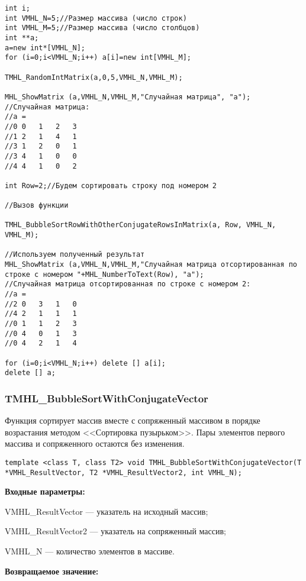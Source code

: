\documentclass[a4paper,12pt]{article}
\begin{document}
\begin{lstlisting}[label=code_use_TMHL_BubbleSortRowWithOtherConjugateRowsInMatrix,caption=Пример использования]
int i;
int VMHL_N=5;//Размер массива (число строк)
int VMHL_M=5;//Размер массива (число столбцов)
int **a;
a=new int*[VMHL_N];
for (i=0;i<VMHL_N;i++) a[i]=new int[VMHL_M];

TMHL_RandomIntMatrix(a,0,5,VMHL_N,VMHL_M);

MHL_ShowMatrix (a,VMHL_N,VMHL_M,"Случайная матрица", "a");
//Случайная матрица:
//a =
//0	0	1	2	3
//1	2	1	4	1
//3	1	2	0	1
//3	4	1	0	0
//4	4	1	0	2

int Row=2;//Будем сортировать строку под номером 2

//Вызов функции

TMHL_BubbleSortRowWithOtherConjugateRowsInMatrix(a, Row, VMHL_N, VMHL_M);

//Используем полученный результат
MHL_ShowMatrix (a,VMHL_N,VMHL_M,"Случайная матрица отсортированная по строке с номером "+MHL_NumberToText(Row), "a");
//Случайная матрица отсортированная по строке с номером 2:
//a =
//2	0	3	1	0
//4	2	1	1	1
//0	1	1	2	3
//0	4	0	1	3
//0	4	2	1	4

for (i=0;i<VMHL_N;i++) delete [] a[i];
delete [] a;
\end{lstlisting}

\subsubsection{TMHL\_BubbleSortWithConjugateVector}\label{TMHL_BubbleSortWithConjugateVector}

Функция сортирует массив вместе с сопряженный массивом в порядке возрастания методом <<Сортировка пузырьком>>. Пары элементов первого массива и сопряженного остаются без изменения.


\begin{lstlisting}[label=code_syntax_TMHL_BubbleSortWithConjugateVector,caption=Синтаксис]
template <class T, class T2> void TMHL_BubbleSortWithConjugateVector(T *VMHL_ResultVector, T2 *VMHL_ResultVector2, int VMHL_N);
\end{lstlisting}

\textbf{Входные параметры:}
 
VMHL\_ResultVector --- указатель на исходный массив;
 
VMHL\_ResultVector2 --- указатель на сопряженный массив;
 
VMHL\_N --- количество элементов в массиве.

\textbf{Возвращаемое значение:}
\end{document}
